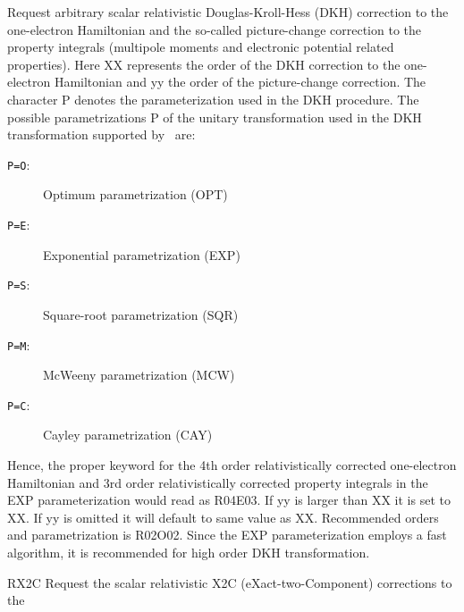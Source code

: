 \begin{keywordlist}
Request arbitrary scalar relativistic Douglas-Kroll-Hess (DKH) correction to the one-electron Hamiltonian
and the so-called picture-change correction to the property integrals (multipole moments
and electronic potential related properties).
Here XX represents the order of the DKH correction to the one-electron Hamiltonian and
yy the order of the picture-change correction. The character P denotes the parameterization
used in the DKH procedure.
The possible parametrizations P of the unitary transformation used
in the DKH transformation supported by \molcas\ are:
\begin{description}
\item[{\tt P=O}:] Optimum parametrization (OPT)
\item[{\tt P=E}:] Exponential parametrization (EXP)
\item[{\tt P=S}:] Square-root parametrization (SQR)
\item[{\tt P=M}:] McWeeny parametrization (MCW)
\item[{\tt P=C}:] Cayley parametrization (CAY)
\end{description}
Hence, the proper keyword for the 4th order relativistically corrected one-electron
Hamiltonian and 3rd order relativistically corrected
property integrals in the EXP parameterization would read as R04E03. If yy is larger than XX it is set to
XX. If yy is omitted it will default to same value as XX. Recommended orders and parametrization is
R02O02.
Since the EXP parameterization employs a fast algorithm, it is
recommended for high order DKH transformation.
\item[RX2C]
Request the scalar relativistic X2C (eXact-two-Component) corrections to the

\end{keywordlist}
